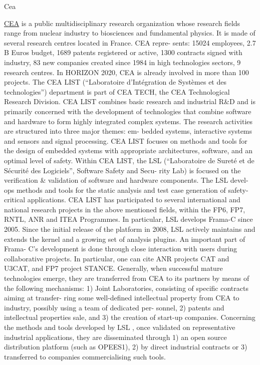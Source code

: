 \begin{sitedescription}{Cea}



\href{http://www.cea.fr/default_gb.htm}{CEA} is a public multidisciplinary research organization whose research fields
range from nuclear industry to biosciences and fundamental physics. It is made
of several research centres located in France. CEA repre- sents: 15024
employees, 2.7 B Euros budget, 1689 patents registered or active, 1300 contracts
signed with industry, 83 new companies created since 1984 in high technologies
sectors, 9 research centres. In HORIZON
2020, CEA is already involved in more than 100 projects. The CEA LIST
(“Laboratoire d'Intégration de Systèmes et des technologies”) department is part
of CEA TECH, the CEA Technological Research Division. CEA LIST combines basic
research and industrial R\&D and is primarily concerned with the development of
technologies that combine software and hardware to form highly integrated
complex systems. The research activities are structured into three major themes:
em- bedded systems, interactive systems and sensors and signal processing. CEA
LIST focuses on methods and tools for the design of embedded systems with
appropriate architectures, software, and an optimal level of safety. Within CEA
LIST, the LSL (“Laboratoire de Sureté et de Sécurité des Logiciels”, Software
Safety and Secu- rity Lab) is focused on the verification \& validation of
software and hardware components. The LSL devel- ops methods and tools for the
static analysis and test case generation of safety-critical applications. CEA
LIST has participated to several international and national research projects in
the above mentioned fields, within the FP6, FP7, RNTL, ANR and ITEA Programmes.
In particular, LSL develops Frama-C since 2005. Since the initial release of the
platform in 2008, LSL actively maintains and extends the kernel and a growing
set of analysis plugins. An important part of Frama- C's development is done
through close interaction with users during collaborative projects. In
particular, one can cite ANR projects CAT and U3CAT, and FP7 project STANCE.
Generally, when successful mature technologies emerge, they are transferred from
CEA to its partners by means of the following mechanisms: 1) Joint Laboratories,
consisting of specific contracts aiming at transfer- ring some well-defined
intellectual property from CEA to industry, possibly using a team of dedicated
per- sonnel, 2) patents and intellectual properties sale, and 3) the creation of
start-up companies. Concerning the methods and tools developed by LSL , once
validated on representative industrial applications, they are disseminated
through 1) an open source distribution platform (such as OPEES1), 2) by direct
industrial contracts or 3) transferred to companies commercialising such tools.


\end{sitedescription}

